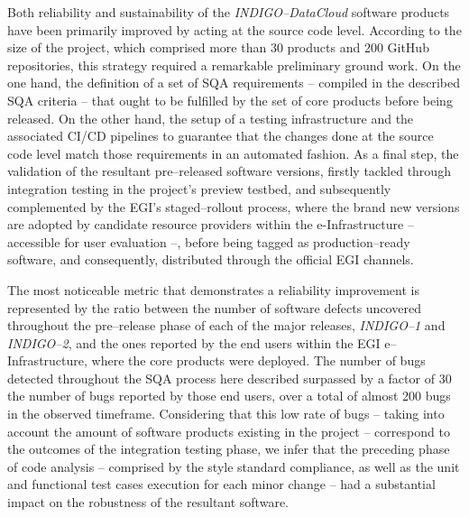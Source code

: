 Both reliability and sustainability of the {\sl INDIGO--DataCloud} software products 
have been primarily improved by acting at the source code level. According to the 
size of the project, which comprised more than 30 products and 200 GitHub repositories, 
this strategy required a remarkable preliminary ground work. On the one hand, the 
definition of a set of SQA requirements -- compiled in the described SQA criteria 
-- that ought to be fulfilled by the set of core products before being
released. On the other hand, the setup of a testing infrastructure and
the associated CI/CD pipelines to guarantee that the changes done at the source code
level match
those requirements in an automated fashion. As a final step, the validation of the 
resultant pre--released software versions, firstly tackled through integration testing in
the project's preview testbed, and subsequently complemented by the EGI's 
staged--rollout process, where the brand new versions are adopted by candidate resource
providers within the e-Infrastructure -- accessible for user evaluation --, before being
tagged as production--ready software, and consequently, distributed through the official
EGI channels.

The most noticeable metric that demonstrates a reliability improvement is represented 
by the ratio between the number of software defects uncovered throughout the pre--release
phase of each of the major releases, {\sl INDIGO--1} and {\sl INDIGO--2}, and the ones 
reported by the end users within the EGI e--Infrastructure, where the core products were 
deployed. The number of bugs detected throughout the SQA process here described 
surpassed by a factor of 30 the number of bugs reported by those end users, over a total
of almost 200 bugs in the observed timeframe. Considering that this low rate of bugs -- 
taking into account the amount of software products existing in the project -- 
correspond to the outcomes of the integration testing phase, we infer that the preceding
phase of code analysis -- comprised by the style standard compliance, as well as the unit and
functional test cases execution for each minor change -- had a substantial impact on the robustness
of the resultant software.

